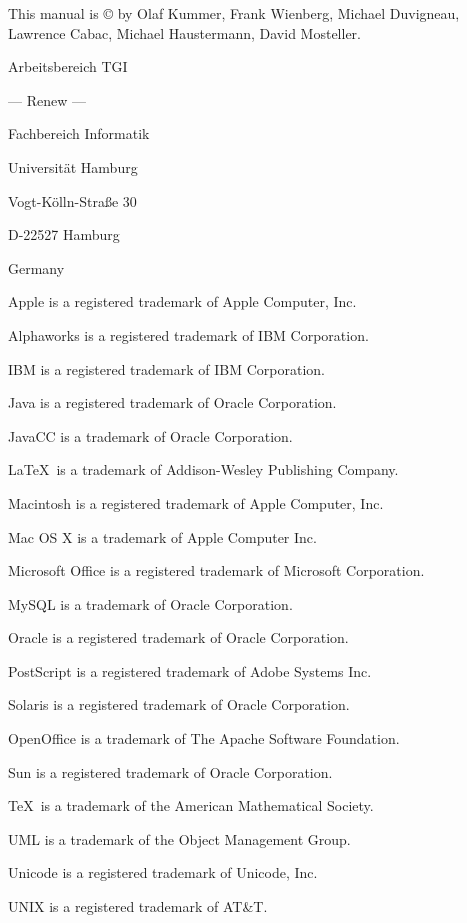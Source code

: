 \begin{tiny}
\begin{flushleft}
This manual is \copyright \renewyear{} by Olaf Kummer, Frank Wienberg,
Michael Duvigneau, Lawrence Cabac, Michael Haustermann, David Mosteller.

\bigskip

Arbeitsbereich TGI

\qquad --- Renew ---

Fachbereich Informatik

Universit\"at Hamburg

Vogt-K\"olln-Stra\ss e 30     

D-22527 Hamburg 

Germany

\vfill

Apple is a registered trademark of Apple Computer, Inc.

Alphaworks is a registered trademark of IBM Corporation.

IBM is a registered trademark of IBM Corporation.

Java is a registered trademark of Oracle Corporation.

JavaCC is a trademark of Oracle Corporation.

\LaTeX\ is a trademark of Addison-Wesley Publishing Company.

Macintosh is a registered trademark of Apple Computer, Inc.

Mac OS X is a trademark of Apple Computer Inc.

Microsoft Office is a registered trademark of Microsoft Corporation.

MySQL is a trademark of Oracle Corporation.

Oracle is a registered trademark of Oracle Corporation.

PostScript is a registered trademark of Adobe Systems Inc.

Solaris is a registered trademark of Oracle Corporation.

OpenOffice is a trademark of The Apache Software Foundation.

Sun is a registered trademark of Oracle Corporation.

\TeX\ is a trademark of the American Mathematical Society.

UML is a trademark of the Object Management Group. 

Unicode is a registered trademark of Unicode, Inc.

UNIX is a registered trademark of AT{\&}T.


\end{flushleft}
\end{tiny}
